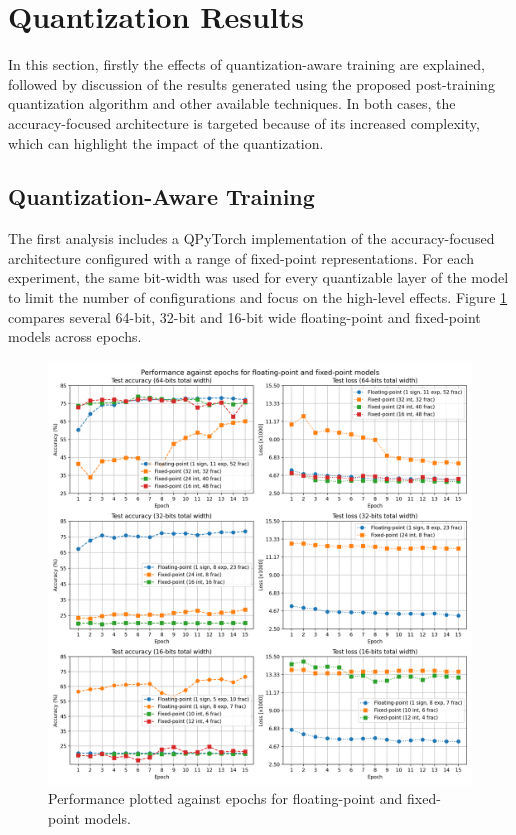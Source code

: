 \section{Quantization Results}
In this section, firstly the effects of quantization-aware training are explained, followed by discussion of the results generated using the proposed post-training quantization algorithm and other available techniques. In both cases, the accuracy-focused architecture is targeted because of its increased complexity, which can highlight the impact of the quantization.

\subsection{Quantization-Aware Training}
The first analysis includes a QPyTorch implementation of the accuracy-focused architecture configured with a range of fixed-point representations. For each experiment, the same bit-width was used for every quantizable layer of the model to limit the number of configurations and focus on the high-level effects. Figure \ref{fig:pre-training} compares several 64-bit, 32-bit and 16-bit wide floating-point and fixed-point models across epochs.

\begin{figure}[hpt!]
  \centering
  \includegraphics[trim={0cm 0cm 0cm 0cm}, clip, width=1.0\textwidth, center]{../logs/training_accuracy.png}
  \caption{Performance plotted against epochs for floating-point and fixed-point models.}
  \label{fig:pre-training}
\end{figure}

